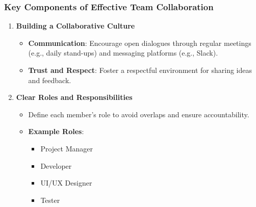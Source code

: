 \documentclass[aspectratio=169]{beamer}
\begin{document}
\begin{frame}[fragile]
    \frametitle{Key Components of Effective Team Collaboration}
    \begin{enumerate}
        \item \textbf{Building a Collaborative Culture}
        \begin{itemize}
            \item \textbf{Communication}: Encourage open dialogues through regular meetings (e.g., daily stand-ups) and messaging platforms (e.g., Slack).
            \item \textbf{Trust and Respect}: Foster a respectful environment for sharing ideas and feedback.
        \end{itemize}

        \item \textbf{Clear Roles and Responsibilities}
        \begin{itemize}
            \item Define each member's role to avoid overlaps and ensure accountability.
            \item \textbf{Example Roles}:
            \begin{itemize}
                \item Project Manager
                \item Developer
                \item UI/UX Designer
                \item Tester
            \end{itemize}
        \end{itemize}
    \end{enumerate}
\end{frame}
\end{document}
